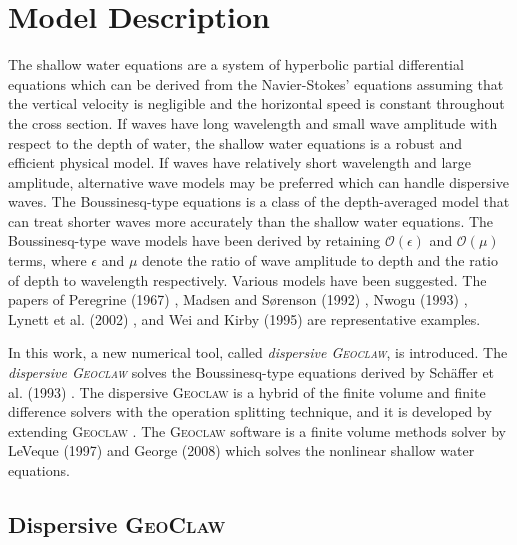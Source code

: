 \documentclass[review]{elsarticle}
\begin{document}
\fi

\section{Model Description}

The shallow water equations
are a system of hyperbolic partial differential equations
which can be derived from 
the Navier-Stokes' equations
assuming that the vertical velocity is negligible and 
the horizontal speed is constant throughout the cross section. 
If waves have long wavelength and small wave amplitude 
with respect to the depth of water,
the shallow water equations is
a robust and efficient physical model. 
If waves have relatively short wavelength and large amplitude,
alternative wave models may be preferred 
which can handle dispersive waves. 
The Boussinesq-type equations
is a class of the depth-averaged model 
that can treat shorter waves more accurately
than the shallow water equations. 
The Boussinesq-type wave models have been derived by retaining 
$\mathcal{O}(\epsilon)$ and $\mathcal{O}(\mu)$ terms, 
where $\epsilon$ and $\mu$ 
denote the ratio of wave amplitude to depth
and the ratio of depth to wavelength respectively. 
Various models have been suggested.  
The papers of Peregrine (1967) \citep{peregrine1967long},
Madsen and S{\o}renson (1992) \citep{madsen1992new}, Nwogu (1993) \citep{nwogu1993alternative}, Lynett et al. (2002) \cite{lynett2002modeling},
and Wei and Kirby (1995) \citep{wei1995time}
are representative examples. 

In this work, a new numerical tool, 
called {\em dispersive \textsc{Geoclaw}}, is introduced. 
The {\em dispersive \textsc{Geoclaw}} solves 
the Boussinesq-type equations derived by
Sch{\"a}ffer et al. (1993) \citep{schaffer1993boussinesq}.
The dispersive \textsc{Geoclaw}
is a hybrid of the finite volume and finite difference solvers
with the operation splitting technique,
and it is developed by extending \textsc{Geoclaw} \citep{clawpack}.
The \textsc{Geoclaw} software is 
a finite volume methods solver
by LeVeque (1997) \cite{leveque1997wave} and George (2008) \citep{george2008augmented}
which solves the nonlinear shallow water equations.

\subsection{Dispersive \textsc{GeoClaw}}
\end{document}
